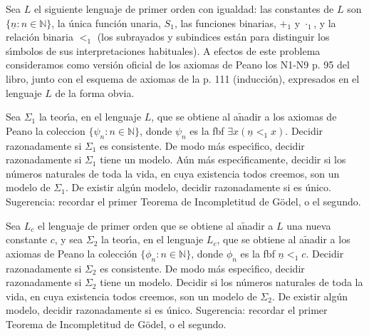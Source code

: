 \begin{problem}
Sea  $L$  el siguiente lenguaje de primer orden  con igualdad: las constantes de $L$ son
$\{\underline{n}: n\in\mathbb{N}\}$, la \'unica funci\'on unaria, $S_1$, las funciones binarias,
$+_1$ y $\cdot_1$, y la relaci\'on binaria $<_1$ (los subrayados y subindices est\'an para
distinguir los s\'{\i}mbolos de sus interpretaciones habituales). A efectos de este problema
consideramos como versi\'on oficial de los axiomas de Peano los N1-N9 p. 95 del libro, junto con el esquema
de axiomas de la p. 111 (inducci\'on), expresados en el lenguaje $L$ de la forma
obvia.

\ppart Sea $\Sigma_1$ la teor\'{\i}a,
 en el lenguaje $L$, que se obtiene al a$\operatorname{\tilde{n}}$adir a los
axiomas de Peano la coleccion $\{ \psi_n: n\in\mathbb{N}\}$, donde
$\psi_n$ es la fbf $\exists x (\underline{n} <_1 x )$.
 Decidir razonadamente si
$\Sigma_1$ es consistente. De modo m\'as espec\'{\i}fico, decidir razonadamente si $\Sigma_1$ tiene un modelo.  A\'un m\'as espec\'{\i}ficamente, decidir si los n\'umeros naturales
de toda la vida, en cuya existencia todos creemos,  son un modelo de $\Sigma_1$.
De existir alg\'un modelo, decidir razonadamente si es \'unico.
Sugerencia: recordar el primer Teorema de Incompletitud de G\"odel, o el segundo.

\ppart Sea $L_c$ el lenguaje de primer orden que se obtiene al a$\operatorname{\tilde{n}}$adir
a $L$ una nueva constante $c$, y sea
$\Sigma_2$ la teor\'{\i}a,
 en el lenguaje $L_c$, que se obtiene al a$\operatorname{\tilde{n}}$adir a los
axiomas de Peano la colección $\{ \phi_n: n\in\mathbb{N}\}$, donde
$\phi_n$ es la fbf $\underline{n} <_1 c$.
Decidir razonadamente si
$\Sigma_2$ es consistente. De modo m\'as espec\'{\i}fico, decidir razonadamente si $\Sigma_2$ tiene un modelo.  Decidir si los n\'umeros naturales
de toda la vida, en cuya existencia todos creemos,  son un modelo de $\Sigma_2$.
De existir alg\'un modelo, decidir razonadamente si es \'unico.
Sugerencia: recordar el primer Teorema de Incompletitud de G\"odel, o el segundo.
\solution
\spart

%
%
%


\end{problem}
